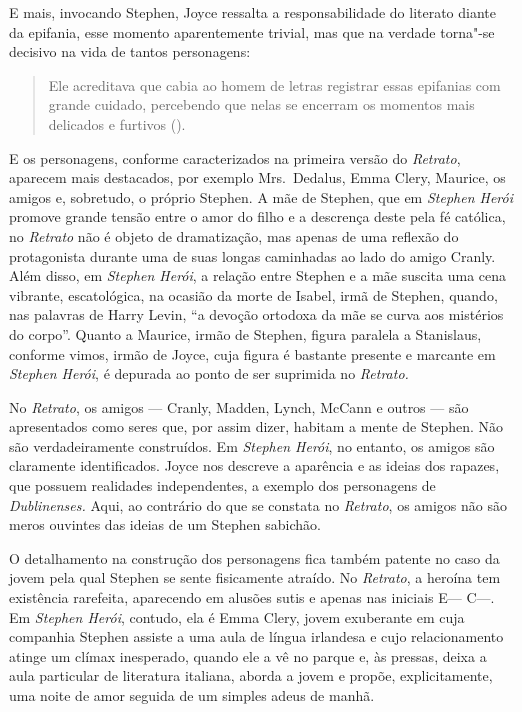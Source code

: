 E mais, invocando
Stephen, Joyce ressalta a responsabilidade do literato diante da
epifania, esse momento aparentemente trivial, mas que na verdade
torna"-se decisivo na vida de tantos personagens: 

\begin{quote}
Ele acreditava que cabia ao homem de letras registrar essas epifanias com grande cuidado,
percebendo que nelas se encerram os momentos mais delicados e furtivos
(\pageref{refintro3}).
\end{quote}

E os personagens, conforme caracterizados na primeira versão do
\textit{Retrato}, aparecem mais destacados, por exemplo Mrs.~Dedalus,
Emma Clery, Maurice, os amigos e, sobretudo, o próprio Stephen.  A mãe
de Stephen, que em \textit{Stephen Herói} promove grande tensão entre o
amor do filho e a descrença deste pela fé católica, no \textit{Retrato}
não é objeto de dramatização, mas apenas de uma reflexão do
protagonista durante uma de suas longas caminhadas ao lado do amigo
Cranly.  Além disso, em \textit{Stephen Herói}, a relação entre Stephen
e a mãe suscita uma cena vibrante, escatológica, na ocasião da morte de
Isabel, irmã de Stephen, quando, nas palavras de Harry Levin, “a
devoção ortodoxa da mãe se curva aos mistérios do corpo”.  Quanto		
a Maurice, irmão de Stephen, figura paralela a Stanislaus, conforme
vimos, irmão de Joyce, cuja figura é bastante presente e marcante em
\textit{Stephen Herói}, é depurada ao ponto de ser suprimida no
\textit{Retrato.} 

No \textit{Retrato}, os amigos --- Cranly, Madden, Lynch, McCann e
outros --- são apresentados como seres que, por assim dizer, habitam a
mente de Stephen.  Não são verdadeiramente construídos.  Em
\textit{Stephen Herói}, no entanto, os amigos são claramente
identificados.  Joyce nos descreve a aparência e as ideias dos rapazes,
que possuem realidades independentes, a exemplo dos personagens de
\textit{Dublinenses.}  Aqui, ao contrário do que se constata no
\textit{Retrato}, os amigos não são meros ouvintes das ideias
de um Stephen sabichão.

O detalhamento na construção dos personagens fica também patente no
caso da jovem pela qual Stephen se sente fisicamente atraído.  No	
\textit{Retrato}, a heroína tem existência rarefeita, aparecendo em
alusões sutis e apenas nas iniciais E--- C---.  Em
\textit{Stephen Herói}, contudo, ela é Emma Clery, jovem exuberante em
cuja companhia Stephen assiste a uma aula de língua irlandesa e cujo
relacionamento atinge um clímax inesperado, quando ele a vê no parque
e, às pressas, deixa a aula particular de literatura italiana, aborda a
jovem e propõe, explicitamente, uma noite de amor seguida de um simples
adeus de manhã.


